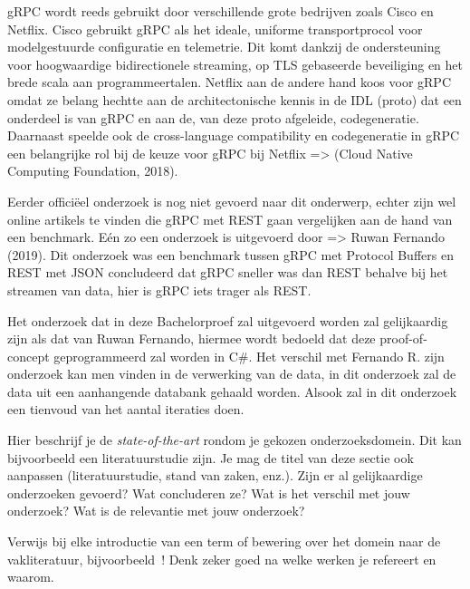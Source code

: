 gRPC wordt reeds gebruikt door verschillende grote bedrijven zoals Cisco en Netflix. 
Cisco gebruikt gRPC als het ideale, uniforme transportprocol voor modelgestuurde configuratie en telemetrie. Dit komt dankzij de ondersteuning voor hoogwaardige bidirectionele streaming, op TLS gebaseerde beveiliging en het brede scala aan programmeertalen. 
Netflix aan de andere hand koos voor gRPC omdat ze belang hechtte aan de architectonische kennis in de IDL (proto) dat een onderdeel is van gRPC en aan de, van deze proto afgeleide, codegeneratie. Daarnaast speelde ook de cross-language compatibility en codegeneratie in gRPC een belangrijke rol bij de keuze voor gRPC bij Netflix \autocite{Foundation2018} => (Cloud Native Computing Foundation, 2018).

Eerder officiëel onderzoek is nog niet gevoerd naar dit onderwerp, echter zijn wel online artikels te vinden die gRPC met REST gaan vergelijken aan de hand van een benchmark. Eén zo een onderzoek is uitgevoerd door \textcite{Fernando2019} => Ruwan Fernando (2019). Dit onderzoek was een benchmark tussen gRPC met Protocol Buffers en REST met JSON concludeerd dat gRPC sneller was dan REST behalve bij het streamen van data, hier is gRPC iets trager als REST.

Het onderzoek dat in deze Bachelorproef zal uitgevoerd worden zal gelijkaardig zijn als dat van Ruwan Fernando, hiermee wordt bedoeld dat deze proof-of-concept geprogrammeerd zal worden in C#. Het verschil met Fernando R. zijn onderzoek kan men vinden in de verwerking van de data, in dit onderzoek zal de data uit een aanhangende databank gehaald worden. Alsook zal in dit onderzoek een tienvoud van het aantal iteraties doen.






Hier beschrijf je de \emph{state-of-the-art} rondom je gekozen onderzoeksdomein. Dit kan bijvoorbeeld een literatuurstudie zijn. Je mag de titel van deze sectie ook aanpassen (literatuurstudie, stand van zaken, enz.). Zijn er al gelijkaardige onderzoeken gevoerd? Wat concluderen ze? Wat is het verschil met jouw onderzoek? Wat is de relevantie met jouw onderzoek?

Verwijs bij elke introductie van een term of bewering over het domein naar de vakliteratuur, bijvoorbeeld~\autocite{Doll1954}! Denk zeker goed na welke werken je refereert en waarom.


